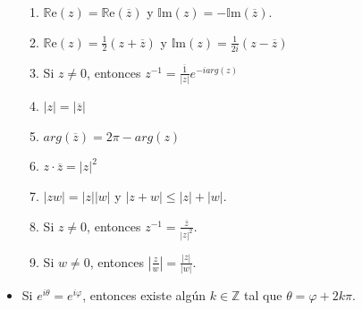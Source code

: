 \documentclass[letterpaper,10pt]{article}
\newcommand{\Z}{\mathbb Z}
\newcommand{\re}{\mathbb R \text{e}}
\newcommand{\im}{\mathbb I \text{m}}
\theoremstyle{plain}
\begin{document}
\begin{framed}
\begin{multicols}{2}
\begin{itemize}
\begin{enumerate}
                    \item $\re(z)= \re (\overline{z})$ y $\im(z)=-\im(\overline{z})$.
                    \item $\re(z)=\frac{1}{2}(z+\overline{z})$ y $\im(z)=\frac{1}{2i}(z-\overline{z})$
                    \item Si $z \neq 0$, entonces $z^{-1}=\frac{\overline{1}}{|z|}e^{-iarg(z)}$
                    \item $|z|=|\overline{z}|$
                    \item $arg(\overline{z})=2\pi - arg(z)$
                    \item $z \cdot \overline{z}=|z|^{2}$
                    \item $|zw|=|z||w|$ y $|z+w|\leq |z|+|w|$.
                    \item Si $z \neq 0$, entonces $z^{-1}=\frac{\overline{z}}{|z|^2}$.
                    \item Si $w \neq 0$, entonces $\left| \frac{z}{w}  \right| = \frac{|z|}{|w|} $.
                \end{enumerate}
	        \item Si $e^{i\theta}=e^{i\varphi}$, entonces existe algún $k \in \Z$ tal que $\theta = \varphi +2k \pi$.
	    \end{itemize}
	\end{multicols}
\end{framed}
\end{document}
